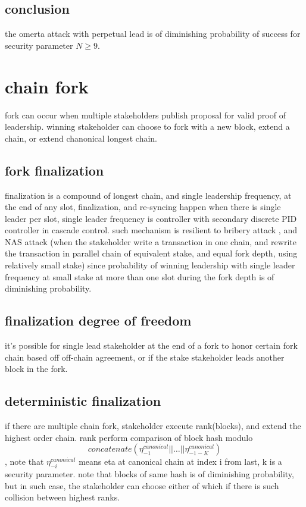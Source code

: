 \documentclass{article}
\begin{document}
\subsection {conclusion}
the omerta attack with perpetual lead is of diminishing probability of success for security parameter $N \ge 9$.

\section{chain fork}
fork can occur when multiple stakeholders publish proposal for valid proof of leadership.
winning stakeholder can choose to fork with a new block, extend a chain, or extend chanonical longest chain.

\subsection{fork finalization}
finalization is a compound of longest chain, and single leadership frequency, at the end of any slot, finalization, and re-syncing happen when there is single leader per slot, single leader frequency is controller with secondary discrete PID controller in cascade control.
such mechanism is resilient to bribery attack \cite{attack_bribery}, and NAS attack (when the stakeholder write a transaction in one chain, and rewrite the transaction in parallel chain of equivalent stake, and equal fork depth, using relatively small stake) since probability of winning leadership with single leader frequency at small stake at more than one slot during the fork depth  is of diminishing probability.

\subsection {finalization degree of freedom}
it's possible for single lead stakeholder at the end of a fork to honor certain fork chain based off off-chain agreement, or if the stake stakeholder leads another block in the fork.

\subsection {deterministic finalization}
if there are multiple chain fork, stakeholder execute rank(blocks), and extend the highest order chain.
rank perform comparison of  block hash modulo
$$concatenate(\eta^{canonical}_{-1}||\dots||\eta^{canonical}_{-1-K})$$,
note that $\eta^{canonical}_{-i}$ means eta at canonical chain at index i from last, k is a security parameter.
note that blocks of same hash is of diminishing probability, but in such case, the stakeholder can choose either of which if there is such collision between highest ranks.
\end{document}
